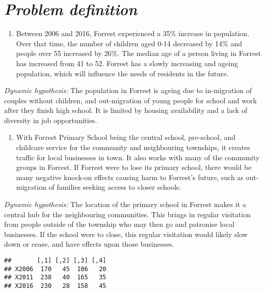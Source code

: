 \documentclass[
  11pt,
]{book}
\providecommand{\tightlist}{%
  \setlength{\itemsep}{0pt}\setlength{\parskip}{0pt}}
\begin{document}
\hypertarget{problem-definition}{%
\section{\texorpdfstring{\emph{Problem definition}}{Problem definition}}\label{problem-definition}}

\begin{enumerate}
\def\labelenumi{\arabic{enumi}.}
\tightlist
\item
  Between 2006 and 2016, Forrest experienced a 35\% increase in population. Over that time, the number of children aged 0-14 decreased by 14\% and people over 55 increased by 26\%. The median age of a person living in Forrest has increased from 41 to 52. Forrest has a slowly increasing and ageing population, which will influence the needs of residents in the future.
\end{enumerate}

\emph{Dynamic hypothesis:}
The population in Forrest is ageing due to in-migration of couples without children, and out-migration of young people for school and work after they finish high school. It is limited by housing availability and a lack of diversity in job opportunities.

\begin{enumerate}
\def\labelenumi{\arabic{enumi}.}
\setcounter{enumi}{1}
\tightlist
\item
  With Forrest Primary School being the central school, pre-school, and childcare service for the community and neighbouring townships, it creates traffic for local businesses in town. It also works with many of the community groups in Forrest. If Forrest were to lose its primary school, there would be many negative knock-on effects causing harm to Forrest's future, such as out-migration of families seeking access to closer schools.
\end{enumerate}

\emph{Dynamic hypothesis:}
The location of the primary school in Forrest makes it a central hub for the neighbouring communities. This brings in regular visitation from people outside of the township who may then go and patronise local businesses. If the school were to close, this regular visitation would likely slow down or cease, and have effects upon those businesses.

\begin{verbatim}
##       [,1] [,2] [,3] [,4]
## X2006  170   45  106   20
## X2011  238   40  165   35
## X2016  230   28  158   45
\end{verbatim}
\end{document}
